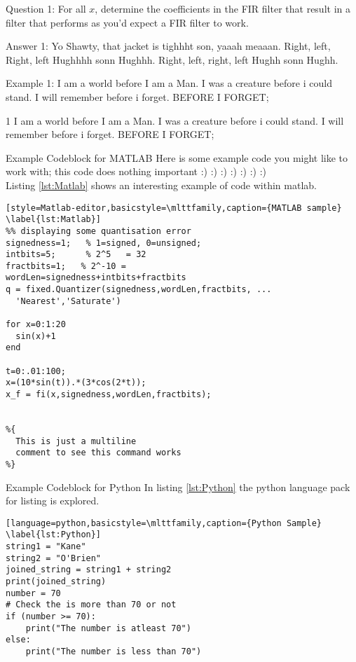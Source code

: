 \begin{question}{Question 1:}
  For all $x$, determine the coefficients in the FIR filter that result in a filter that performs as you'd expect a FIR filter to work.
\end{question}

\begin{answer}{Answer 1:}
Yo Shawty, that jacket is tighhht son, yaaah meaaan. Right, left, Right, left Hughhhh sonn Hughhh. Right, left, right, left Hughh sonn Hughh.
\end{answer}

\begin{example}{Example 1:}
I am a world before I am a Man. I was a creature before i could stand. I will remember before i forget. BEFORE I FORGET;
\end{example}

\begin{title1}{1}
I am a world before I am a Man. I was a creature before i could stand. I will remember before i forget. BEFORE I FORGET;
\end{title1}

\begin{codeblock}{Example Codeblock for MATLAB}
Here is some example code you might like to work with; this code does nothing important :) :) :) :) :) :) :)\\

Listing \ref{lst:Matlab} shows an interesting example of code within matlab.
\begin{lstlisting}[style=Matlab-editor,basicstyle=\mlttfamily,caption={MATLAB sample} \label{lst:Matlab}]
%% displaying some quantisation error
signedness=1;   % 1=signed, 0=unsigned;
intbits=5;      % 2^5   = 32
fractbits=1;   % 2^-10 =
wordLen=signedness+intbits+fractbits
q = fixed.Quantizer(signedness,wordLen,fractbits, ...
  'Nearest','Saturate')

for x=0:1:20
  sin(x)+1
end

t=0:.01:100;
x=(10*sin(t)).*(3*cos(2*t));
x_f = fi(x,signedness,wordLen,fractbits);


%{
  This is just a multiline
  comment to see this command works
%}
\end{lstlisting}
\end{codeblock}



\begin{codeblock}{Example Codeblock for Python}
In listing \ref{lst:Python} the python language pack for listing is explored.

\begin{lstlisting}[language=python,basicstyle=\mlttfamily,caption={Python Sample} \label{lst:Python}]
string1 = "Kane"
string2 = "O'Brien"
joined_string = string1 + string2
print(joined_string)
number = 70
# Check the is more than 70 or not
if (number >= 70):
    print("The number is atleast 70")
else:
    print("The number is less than 70")
\end{lstlisting}
\end{codeblock}
\clearpage
